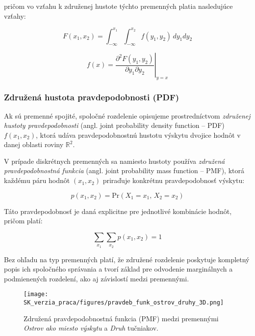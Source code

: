 pričom vo vzťahu k združenej hustote týchto premenných platia nasledujúce vzťahy:

\begin{equation}
F(x_1, x_2) = \int_{-\infty}^{x_1} \int_{-\infty}^{x_2} f(y_1, y_2) \, dy_1 dy_2
\end{equation}

\begin{equation}
f(x) = \left. \frac{\partial^2 F(y_1, y_2)}{\partial y_1 \partial y_2} \right|_{y = x}
\end{equation}

\subsubsection{Združená hustota pravdepodobnosti (PDF)}\label{subsec:joint_pdf}

Ak sú premenné spojité, spoločné rozdelenie opisujeme prostredníctvom \textit{združenej hustoty pravdepodobnosti} (angl. joint probability density function – PDF) $f(x_1, x_2)$, ktorá udáva pravdepodobnostnú hustotu výskytu dvojice hodnôt v danej oblasti roviny $\mathbb{R}^2$.

V prípade diskrétnych premenných sa namiesto hustoty používa \textit{združená pravdepodobnostná funkcia} (angl. joint probability mass function – PMF), ktorá každému páru hodnôt $(x_1, x_2)$ priraďuje konkrétnu pravdepodobnosť výskytu: 

\begin{equation}
p(x_1, x_2) = \mathrm{Pr}(X_1 = x_1,\, X_2 = x_2)
\end{equation}

Táto pravdepodobnosť je daná explicitne pre jednotlivé kombinácie hodnôt, pričom platí:

\begin{equation}
\sum_{x_1} \sum_{x_2} p(x_1, x_2) = 1
\end{equation}

Bez ohľadu na typ premenných platí, že združené rozdelenie poskytuje kompletný popis ich spoločného správania a tvorí základ pre odvodenie marginálnych a podmienených rozdelení, ako aj závislostí medzi premennými.

\begin{figure}[H]
    \centering
    \texttt{[image: SK\_verzia\_praca/figures/pravdeb\_funk\_ostrov\_druhy\_3D.png]}
    \caption{Združená pravdepodobnostná funkcia (PMF) medzi premennými \textit{Ostrov ako miesto výskytu} a \textit{Druh} tučniakov.}
    \label{fig:miesto_druh_joint_density}
\end{figure}

